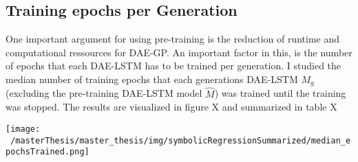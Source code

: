 \documentclass[
  11pt,
]{article}
\let\origfigure\figure
\let\endorigfigure\endfigure
\renewenvironment{figure}[1][2] {
    \expandafter\origfigure\expandafter[H]
} {
    \endorigfigure
}
\begin{document}
\hypertarget{training-epochs-per-generation}{%
\subsection{Training epochs per Generation}\label{training-epochs-per-generation}}

One important argument for using pre-training is the reduction of runtime and computational ressources for DAE-GP. An important factor in this, is the number of epochs that each DAE-LSTM has to be trained per generation. I studied the median number of training epochs that each generations DAE-LSTM \(M_g\) (excluding the pre-training DAE-LSTM model \(\hat{M}\)) was trained until the training was stopped. The results are visualized in figure X and summarized in table X

\begin{figure}
\centering
\texttt{[image: ~/masterThesis/master\_thesis/img/symbolicRegressionSummarized/median\_epochsTrained.png]}
\caption{Median Number of Training Epochs per Generation - Symbolic Regression}
\end{figure}
\end{document}
